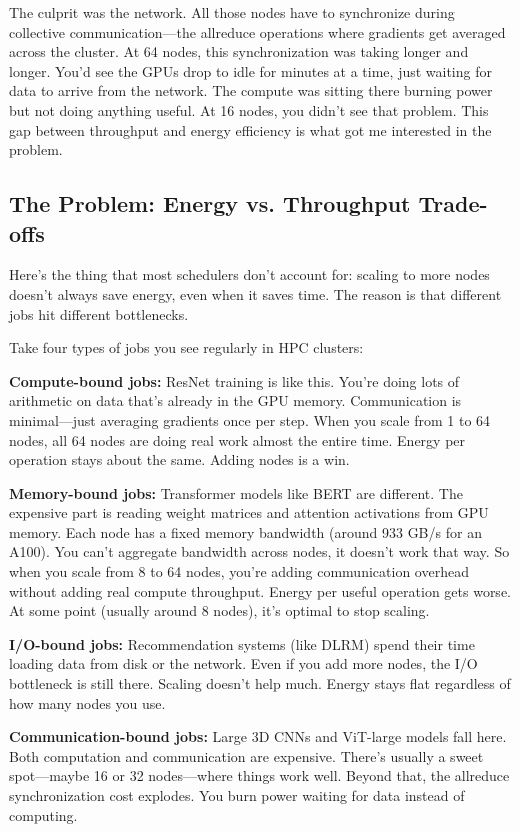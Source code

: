 \documentclass[conference]{IEEEtran}
\begin{document}
The culprit was the network. All those nodes have to synchronize during collective communication---the allreduce operations where gradients get averaged across the cluster. At 64 nodes, this synchronization was taking longer and longer. You'd see the GPUs drop to idle for minutes at a time, just waiting for data to arrive from the network. The compute was sitting there burning power but not doing anything useful. At 16 nodes, you didn't see that problem. This gap between throughput and energy efficiency is what got me interested in the problem.

\subsection{The Problem: Energy vs. Throughput Trade-offs}

Here's the thing that most schedulers don't account for: scaling to more nodes doesn't always save energy, even when it saves time. The reason is that different jobs hit different bottlenecks.

Take four types of jobs you see regularly in HPC clusters:

\textbf{Compute-bound jobs:} ResNet training is like this. You're doing lots of arithmetic on data that's already in the GPU memory. Communication is minimal---just averaging gradients once per step. When you scale from 1 to 64 nodes, all 64 nodes are doing real work almost the entire time. Energy per operation stays about the same. Adding nodes is a win.

\textbf{Memory-bound jobs:} Transformer models like BERT are different. The expensive part is reading weight matrices and attention activations from GPU memory. Each node has a fixed memory bandwidth (around 933 GB/s for an A100). You can't aggregate bandwidth across nodes, it doesn't work that way. So when you scale from 8 to 64 nodes, you're adding communication overhead without adding real compute throughput. Energy per useful operation gets worse. At some point (usually around 8 nodes), it's optimal to stop scaling.

\textbf{I/O-bound jobs:} Recommendation systems (like DLRM) spend their time loading data from disk or the network. Even if you add more nodes, the I/O bottleneck is still there. Scaling doesn't help much. Energy stays flat regardless of how many nodes you use.

\textbf{Communication-bound jobs:} Large 3D CNNs and ViT-large models fall here. Both computation and communication are expensive. There's usually a sweet spot---maybe 16 or 32 nodes---where things work well. Beyond that, the allreduce synchronization cost explodes. You burn power waiting for data instead of computing.
\end{document}

